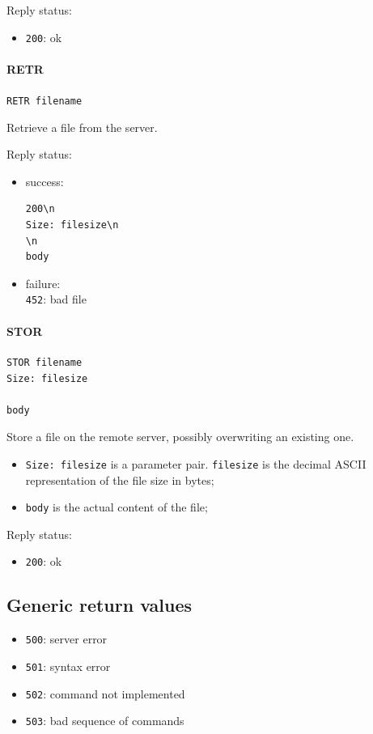 \documentclass[a4paper,12pt]{article}
\begin{document}
Reply status:
\begin{itemize}
  \item \texttt{200}: ok
\end{itemize}

\paragraph{RETR}
\texttt{RETR filename}

Retrieve a file from the server.

Reply status:
\begin{itemize}
  \item success:
\begin{verbatim}
200\n
Size: filesize\n
\n
body
\end{verbatim}
  \item failure:\\
  \texttt{452}: bad file
\end{itemize}

\paragraph{STOR}
\begin{verbatim}
STOR filename
Size: filesize

body
\end{verbatim}

Store a file on the remote server, possibly overwriting an existing one.

\begin{itemize}
  \item \texttt{Size: filesize} is a parameter pair. \texttt{filesize} is the decimal ASCII representation of the file size in bytes;
  \item \texttt{body} is the actual content of the file;
\end{itemize}

Reply status:
\begin{itemize}
  \item \texttt{200}: ok
\end{itemize}

\subsection{Generic return values}
\begin{itemize}
  \item \texttt{500}: server error
  \item \texttt{501}: syntax error
  \item \texttt{502}: command not implemented
  \item \texttt{503}: bad sequence of commands
\end{itemize}
\end{document}
